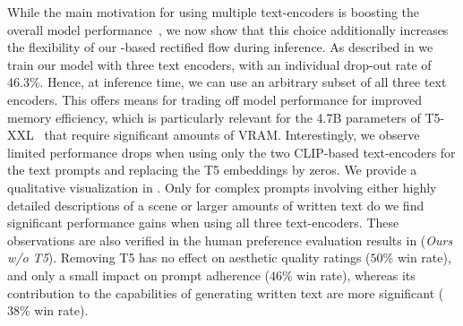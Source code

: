 %
While the main motivation for using multiple text-encoders is boosting the overall model performance~\cite{balaji2022ediffi}, we now show that this choice additionally increases the flexibility of our \modelname-based rectified flow during inference.
As described in  we train our model with three text encoders, with an individual drop-out rate of 46.3\%. 
Hence, at inference time, we can use an arbitrary subset of all three text
encoders. This offers means for trading off model performance for improved
memory efficiency, which is particularly relevant for the 4.7B parameters of
T5-XXL~\citep{raffel2019exploring} that require significant amounts of VRAM.
Interestingly, we observe limited performance drops when using only the two
CLIP-based text-encoders for the text prompts and replacing the T5 embeddings
by zeros. We provide a qualitative visualization in
. Only for complex prompts involving either highly
detailed descriptions of a scene or larger amounts of written text do we find
significant performance gains when using all three text-encoders. These
observations are also verified in the human preference evaluation results in
 (\emph{Ours w/o T5}).
Removing T5 has no effect on aesthetic quality ratings ($50\%$ win rate), and only a small impact on prompt adherence ($46\%$ win rate), whereas its contribution to the capabilities of generating written text are more significant ($38\%$ win rate).
%


%

%
%
